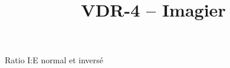 \documentclass[aspectratio=169]{beamer}
\title{VDR-4 -- Imagier}
\institute{}
\begin{document}
\maketitle

\begin{frame}{Ratio I:E normal et inversé}
	
\end{frame}
\end{document}
